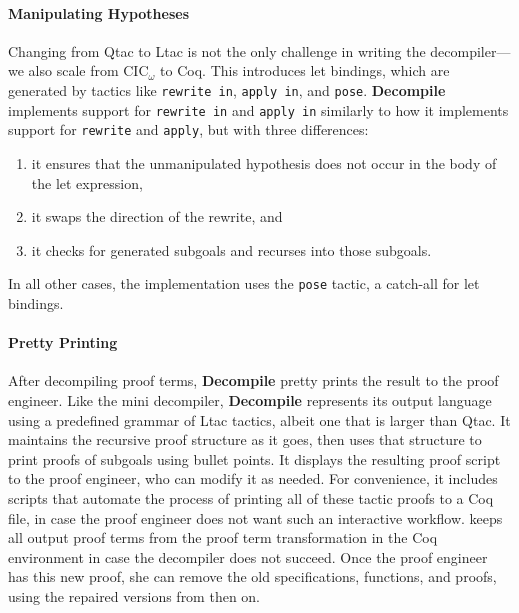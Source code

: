 \paragraph{Manipulating Hypotheses}
Changing from Qtac to Ltac is not the only challenge in writing the decompiler---we also scale from CIC$_{\omega}$ to Coq.
This introduces let bindings, which are generated by tactics like \lstinline{rewrite in}, \lstinline{apply in}, and \lstinline{pose}.
\textbf{Decompile} implements support for \lstinline{rewrite in} and \lstinline{apply in} similarly to how it implements support for
\lstinline{rewrite} and \lstinline{apply}, but with three differences:

\begin{enumerate}
\item it ensures that the unmanipulated hypothesis does not occur in the body of the let expression,
\item it swaps the direction of the rewrite, and
\item it checks for generated subgoals and recurses into those subgoals.
\end{enumerate}
In all other cases, the implementation uses the \lstinline{pose} tactic, a catch-all for let bindings.

\paragraph{Pretty Printing}
After decompiling proof terms, \textbf{Decompile} pretty prints the result to the proof engineer.
Like the mini decompiler, \textbf{Decompile} represents its output language using a predefined grammar of Ltac tactics,
albeit one that is larger than Qtac.
It maintains the recursive proof structure as it goes, then uses that structure to print proofs of subgoals using bullet points.
It displays the resulting proof script to the proof engineer, who can modify it as needed.
For convenience, it includes scripts that automate the process of printing all of these tactic proofs to a Coq file,
in case the proof engineer does not want such an interactive workflow.
\toolname keeps all output proof terms from the proof term transformation in the Coq environment in case the decompiler does not succeed.
Once the proof engineer has this new proof, she can remove the old specifications, functions, and proofs, using the repaired
versions from then on.


